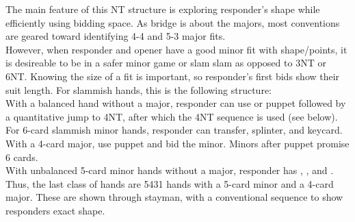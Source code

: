 \documentclass[12pt]{report}
\newcommand{\n}{\\}
\begin{document}
    The main feature of this NT structure is exploring responder's shape while efficiently using bidding space.  As bridge is about the majors, most conventions are geared toward identifying 4-4 and 5-3 major fits.\n

    However, when responder and opener have a good minor fit with shape/points, it is desireable to be in a safer minor game or slam slam as opposed to 3NT or 6NT.  Knowing the size of a fit is important, so responder's first bids show their suit length. For slammish hands, this is the following structure: \n
    
    With a balanced hand without a major, responder can use  or  puppet followed by a quantitative jump to 4NT, after which the 4NT sequence is used (see below). \n
    
    For 6-card slammish minor hands, responder can transfer, splinter, and keycard.  With a 4-card major, use puppet and bid the minor.  Minors after puppet promise 6 cards. \n

    With unbalanced 5-card minor hands without a major, responder has , , and .  Thus, the last class of hands are 5431 hands with a 5-card minor and a 4-card major.  These are shown through  stayman, with a conventional sequence to show responders exact shape. \n\n
\end{document}
